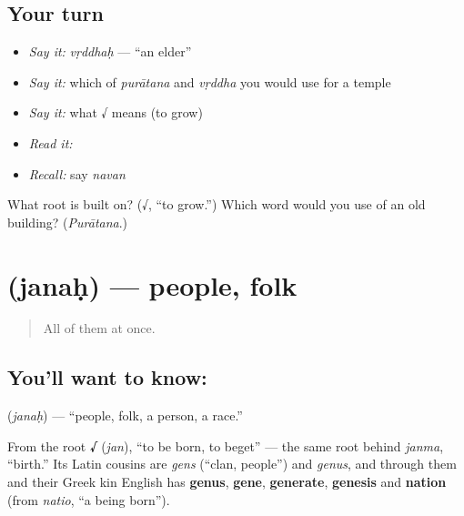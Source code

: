 \subsection*{Your turn}
\begin{itemize}
\raggedright
  \item \emph{Say it:} \emph{vṛddhaḥ} — \textquotedblleft{}an elder\textquotedblright{}
  \item \emph{Say it:} which of \emph{purātana} and \emph{vṛddha} you would use for a temple
  \item \emph{Say it:} what √ means (to grow)
  \item \emph{Read it:} \textbf{}
  \item \emph{Recall:} say \emph{navan}
\end{itemize}

\begin{tcolorbox}[breakable,colback=teal!4,colframe=teal!35!black,title={Before you move on}]
What root is  built on? (√, \textquotedblleft{}to grow.\textquotedblright{}) Which word would you use of an old building? (\emph{Purātana}.)
\end{tcolorbox}
\section[\texorpdfstring{\sk{जनः} (janaḥ)}{जनः (janaḥ)}]{ (janaḥ) — people, folk}

\label{lesson:SA-C20-people}



\begin{quote}
All of them at once.
\end{quote}

\subsection*{You'll want to know: }
\textbf{} (\emph{janaḥ}) — \textquotedblleft{}people, folk, a person, a race.\textquotedblright{}

From the root \textbf{√} (\emph{jan}), \textquotedblleft{}to be born, to beget\textquotedblright{} — the same root behind \emph{janma}, \textquotedblleft{}birth.\textquotedblright{} Its Latin cousins are \emph{gens} (\textquotedblleft{}clan, people\textquotedblright{}) and \emph{genus}, and through them and their Greek kin English has \textbf{genus}, \textbf{gene}, \textbf{generate}, \textbf{genesis} and \textbf{nation} (from \emph{natio}, \textquotedblleft{}a being born\textquotedblright{}).

